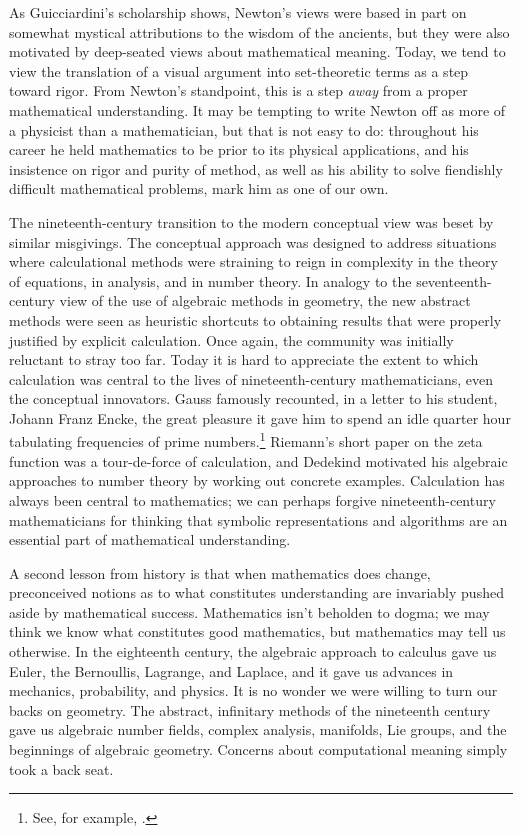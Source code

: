 \documentclass[12pt]{amsart}
\theoremstyle{definition}
\theoremstyle{remark}
\numberwithin{equation}{section}
\begin{document}
As Guicciardini's scholarship shows, Newton's views were based in part on somewhat mystical attributions to the wisdom of the ancients, but they were also motivated by deep-seated views about mathematical meaning. Today, we tend to view the translation of a visual argument into set-theoretic terms as a step toward rigor. From Newton's standpoint, this is a step \emph{away} from a proper mathematical understanding. It may be tempting to write Newton off as more of a physicist than a mathematician, but that is not easy to do: throughout his career he held mathematics to be prior to its physical applications, and his insistence on rigor and purity of method, as well as his ability to solve fiendishly difficult mathematical problems, mark him as one of our own.

The nineteenth-century transition to the modern conceptual view was beset by similar misgivings. The conceptual approach was designed to address situations where calculational methods were straining to reign in complexity in the theory of equations, in analysis, and in number theory. In analogy to the seventeenth-century view of the use of algebraic methods in geometry, the new abstract methods were seen as heuristic shortcuts to obtaining results that were properly justified by explicit calculation. Once again, the community was initially reluctant to stray too far. Today it is hard to appreciate the extent to which calculation was central to the lives of nineteenth-century mathematicians, even the conceptual innovators. Gauss famously recounted, in a letter to his student, Johann Franz Encke, the great pleasure it gave him to spend an idle quarter hour tabulating frequencies of prime numbers.\footnote{See, for example, \cite{tschinkel:06}.} Riemann's short paper on the zeta function was a tour-de-force of calculation, and Dedekind motivated his algebraic approaches to number theory by working out concrete examples. Calculation has always been central to mathematics; we can perhaps forgive nineteenth-century mathematicians for thinking that symbolic representations and algorithms are an essential part of mathematical understanding.

A second lesson from history is that when mathematics does change, preconceived notions as to what constitutes understanding are invariably pushed aside by mathematical success. Mathematics isn't beholden to dogma; we may think we know what constitutes good mathematics, but mathematics may tell us otherwise. In the eighteenth century, the algebraic approach to calculus gave us Euler, the Bernoullis, Lagrange, and Laplace, and it gave us advances in mechanics, probability, and physics. It is no wonder we were willing to turn our backs on geometry. The abstract, infinitary methods of the nineteenth century gave us algebraic number fields, complex analysis, manifolds, Lie groups, and the beginnings of algebraic geometry. Concerns about computational meaning simply took a back seat.
\end{document}
